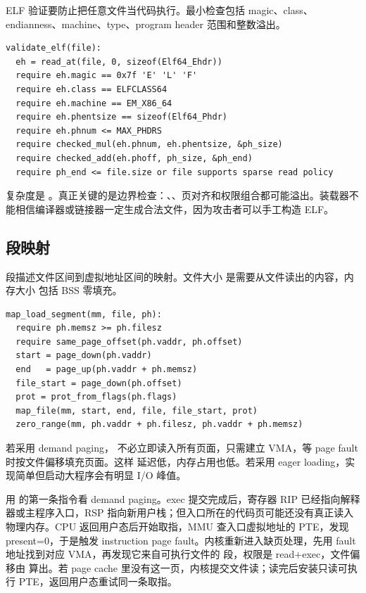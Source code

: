 ELF 验证要防止把任意文件当代码执行。最小检查包括 magic、class、endianness、machine、type、program header 范围和整数溢出。

\begin{lstlisting}
validate_elf(file):
  eh = read_at(file, 0, sizeof(Elf64_Ehdr))
  require eh.magic == 0x7f 'E' 'L' 'F'
  require eh.class == ELFCLASS64
  require eh.machine == EM_X86_64
  require eh.phentsize == sizeof(Elf64_Phdr)
  require eh.phnum <= MAX_PHDRS
  require checked_mul(eh.phnum, eh.phentsize, &ph_size)
  require checked_add(eh.phoff, ph_size, &ph_end)
  require ph_end <= file.size or file supports sparse read policy
\end{lstlisting}

复杂度是 。真正关键的是边界检查：、、页对齐和权限组合都可能溢出。装载器不能相信编译器或链接器一定生成合法文件，因为攻击者可以手工构造 ELF。

\subsection{段映射}

 段描述文件区间到虚拟地址区间的映射。文件大小  是需要从文件读出的内容，内存大小  包括 BSS 零填充。

\begin{lstlisting}
map_load_segment(mm, file, ph):
  require ph.memsz >= ph.filesz
  require same_page_offset(ph.vaddr, ph.offset)
  start = page_down(ph.vaddr)
  end   = page_up(ph.vaddr + ph.memsz)
  file_start = page_down(ph.offset)
  prot = prot_from_flags(ph.flags)
  map_file(mm, start, end, file, file_start, prot)
  zero_range(mm, ph.vaddr + ph.filesz, ph.vaddr + ph.memsz)
\end{lstlisting}

若采用 demand paging， 不必立即读入所有页面，只需建立 VMA，等 page fault 时按文件偏移填充页面。这样  延迟低，内存占用也低。若采用 eager loading，实现简单但启动大程序会有明显 I/O 峰值。

用  的第一条指令看 demand paging。exec 提交完成后，寄存器 RIP 已经指向解释器或主程序入口，RSP 指向新用户栈；但入口所在的代码页可能还没有真正读入物理内存。CPU 返回用户态后开始取指，MMU 查入口虚拟地址的 PTE，发现 present=0，于是触发 instruction page fault。内核重新进入缺页处理，先用 fault 地址找到对应 VMA，再发现它来自可执行文件的  段，权限是 read+exec，文件偏移由  算出。若 page cache 里没有这一页，内核提交文件读；读完后安装只读可执行 PTE，返回用户态重试同一条取指。


